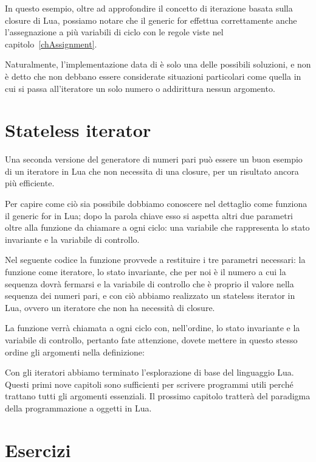 In questo esempio, oltre ad approfondire il concetto di iterazione basata sulla
closure di Lua, possiamo notare che il generic for effettua correttamente anche
l'assegnazione a più variabili di ciclo con le regole viste nel
capitolo~\ref{chAssignment}.

Naturalmente, l'implementazione data di  è solo una delle possibili
soluzioni, e non è detto che non debbano essere considerate situazioni
particolari come quella in cui si passa all'iteratore un solo numero o
addirittura nessun argomento.


\section{Stateless iterator}

Una seconda versione del generatore di numeri pari può essere un buon esempio
di un iteratore in Lua che non necessita di una closure, per un risultato ancora
più efficiente.

Per capire come ciò sia possibile dobbiamo conoscere nel dettaglio come
funziona il generic for in Lua; dopo la parola chiave  esso si aspetta
altri due parametri oltre alla funzione da chiamare a ogni ciclo: una variabile
che rappresenta lo stato invariante e la variabile di controllo.

Nel seguente codice la funzione  provvede a restituire i tre
parametri necessari: la funzione  come iteratore, lo stato
invariante, che per noi è il numero a cui la sequenza dovrà fermarsi e la
variabile di controllo che è proprio il valore nella sequenza dei numeri pari,
e con ciò abbiamo realizzato un stateless iterator in Lua, ovvero un iteratore
che non ha necessità di closure.

La funzione  verrà chiamata a ogni ciclo con, nell'ordine, lo
stato invariante e la variabile di controllo, pertanto fate attenzione, dovete
mettere in questo stesso ordine gli argomenti nella definizione:

Con gli iteratori abbiamo terminato l'esplorazione di base del linguaggio Lua.
Questi primi nove capitoli sono sufficienti per scrivere programmi utili perché
trattano tutti gli argomenti essenziali. Il prossimo capitolo tratterà del
paradigma della programmazione a oggetti in Lua.


\section{Esercizi}

